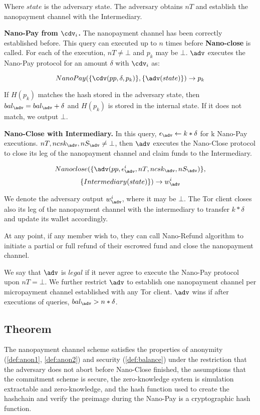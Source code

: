 Where $state$ is the adversary state. The adversary obtains $nT$ and establish the nanopayment channel with the Intermediary.

\textbf{Nano-Pay from $\cdv_i$.} The nanopayment channel has been correctly established before. This query can executed up to $n$ times before \textbf{Nano-close} is called. For each of the execution, $nT \neq \bot$ and $p_k$ may be $\bot$.  $\adv$ executes the Nano-Pay protocol for an amount $\delta$ with $\cdv_i$ as:

$$Nano\-Pay(\{\cdv(pp,\delta,p_k)\},\{\adv(state)\}) \rightarrow p_k$$

If $H(p_k)$ matches the hash stored in the adversary state, then $bal_\adv = bal_\adv+\delta$ and $H(p_k)$ is stored in the internal state. If it does not match, we output $\bot$.

\textbf{Nano-Close with Intermediary.} In this query, $\epsilon_\adv \leftarrow k*\delta$ for k Nano-Pay executions. $nT, ncsk_\adv, nS_\adv \neq \bot$, then $\adv$ executes the Nano-Close protocol to close its leg of the nanopayment channel and claim funds to the Intermediary. 

$$Nano\-close(\{\adv(pp, \epsilon^i_\adv, nT, ncsk_\adv, nS_\adv)\},$$
$$\{Intermediary(state)\}) \rightarrow w^i_\adv$$

We denote the adversary output $w^i_\adv$, where it may be $\bot$. The Tor client closes also its leg of the nanopayment channel with the intermediary to transfer $k*\delta$ and update its wallet accordingly.

At any point, if any member wish to, they can call Nano-Refund algorithm to initiate a partial or full refund of their escrowed fund and close the nanopayment channel.

We say that $\adv$ is $legal$ if it never agree to execute the Nano-Pay protocol upon $nT = \bot$. We further restrict $\adv$ to establish one nanopayment channel per micropayment channel established with any Tor client. $\adv$ wins if after executions of queries, $bal_\adv > n*\delta$.

\subsection{Theorem}
The nanopayment channel scheme satisfies the properties of anonymity (\ref{def:anon1}, \ref{def:anon2})
 and security (\ref{def:balance}) under the restriction that the adversary does not abort before Nano-Close finished, the assumptions that the commitment scheme is secure, the zero-knowledge system is simulation extractable and zero-knowledge, and the hash function used to create the hashchain and verify the preimage during the Nano-Pay is a cryptographic hash function.

